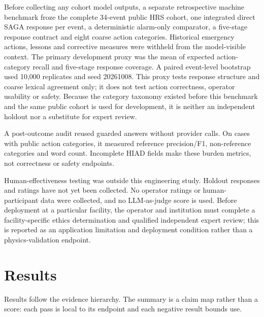 \documentclass[12pt,a4paper]{article}
\begin{document}
Before collecting any cohort model outputs, a separate retrospective machine
benchmark froze the complete 34-event public HRS cohort, one integrated direct
SAGA response per event, a deterministic alarm-only comparator, a five-stage
response contract and eight coarse action categories. Historical emergency
actions, lessons and corrective measures were withheld from the model-visible
context. The primary development proxy was the mean of expected action-category
recall and five-stage response coverage. A paired event-level bootstrap used
10,000 replicates and seed 20261008. This proxy tests response structure and
coarse lexical agreement only; it does not test action correctness, operator
usability or safety. Because the category taxonomy existed before this benchmark
and the same public cohort is used for development, it is neither an independent
holdout nor a substitute for expert review.

A post-outcome audit reused guarded answers without provider calls. On cases
with public action categories, it measured reference precision/F1,
non-reference categories and word count. Incomplete HIAD fields make these
burden metrics, not correctness or safety endpoints.

Human-effectiveness testing was outside this engineering study. Holdout responses
and ratings have not yet been collected. No operator ratings or human-participant
data were collected, and no LLM-as-judge score is used. Before deployment at a
particular facility, the operator and institution
must complete a facility-specific ethics determination and qualified independent
expert review; this is reported as an application limitation and deployment
condition rather than a physics-validation endpoint.

\section{Results}
Results follow the evidence hierarchy. The summary is a claim map rather than a
score: each pass is local to its endpoint and each negative result bounds
use.
\end{document}
